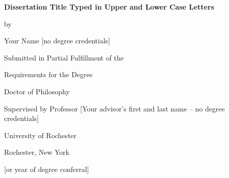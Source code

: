 

\begin{titlepage}
  \vspace*{\fill}

  \begin{center}
    {\LARGE \bfseries Dissertation Title Typed in Upper and Lower Case
      Letters \par
    }

    \bigskip%
    by

    \bigskip%
    Your Name [no degree credentials]


    \bigskip\bigskip\bigskip\bigskip%
    Submitted in Partial Fulfillment of the

    \bigskip%
    Requirements for the Degree

    \bigskip%
    Doctor of Philosophy


    \bigskip\bigskip\bigskip\bigskip%
    Supervised by Professor [Your advisor's first and last name -- no degree credentials]

    \bigskip{}




    \bigskip\bigskip\bigskip\bigskip%
    University of Rochester

    \bigskip%
    Rochester, New York


    \bigskip\bigskip\bigskip{} [or year of degree conferral]
  \end{center}

  \vspace*{\fill}
\end{titlepage}

